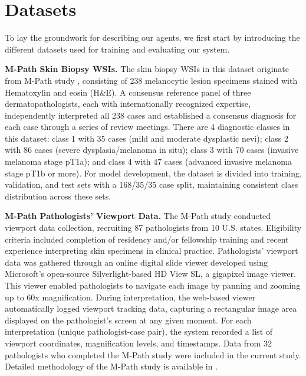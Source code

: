 \section{Datasets}
To lay the groundwork for describing our agents, we first start by introducing the different datasets used for training and evaluating our system.

\label{data-mpath}
\noindent\textbf{M-Path Skin Biopsy WSIs.} The skin biopsy WSIs in this dataset originate from M-Path study \cite{elmore2017pathologists, carney2016achieving, onega2018accuracy}, consisting of 238 melanocytic lesion specimens stained with Hematoxylin and eosin (H\&E). A consensus reference panel of three dermatopathologists, each with internationally recognized expertise, independently interpreted all 238 cases and established a consensus diagnosis for each case through a series of review meetings. There are 4 diagnostic classes in this dataset: class 1 with 35 cases (mild and moderate dysplastic nevi); class 2 with 86 cases (severe dysplasia/melanoma in situ); class 3 with 70 cases (invasive melanoma stage pT1a); and class 4 with 47 cases (advanced invasive melanoma stage pT1b or more). For model development, the dataset is divided into training, validation, and test sets with a 168/35/35 case split, maintaining consistent class distribution across these sets.

\noindent\textbf{M-Path Pathologists’ Viewport Data.}
The M-Path study conducted viewport data collection, recruiting 87 pathologists from 10 U.S. states. Eligibility criteria included completion of residency and/or fellowship training and recent experience interpreting skin specimens in clinical practice. Pathologists’ viewport data was gathered through an online digital slide viewer developed using Microsoft’s open-source Silverlight-based HD View SL, a gigapixel image viewer. This viewer enabled pathologists to navigate each image by panning and zooming up to 60x magnification. During interpretation, the web-based viewer automatically logged viewport tracking data, capturing a rectangular image area displayed on the pathologist's screen at any given moment. For each interpretation (unique pathologist-case pair), the system recorded a list of viewport coordinates, magnification levels, and timestamps. Data from 32 pathologists who completed the M-Path study were included in the current study. Detailed methodology of the M-Path study is available in \cite{onega2018accuracy}.



